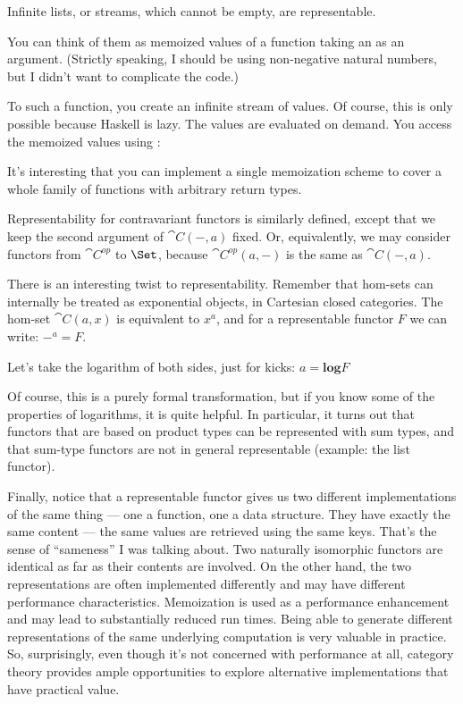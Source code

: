 Infinite lists, or streams, which cannot be empty, are representable.

You can think of them as memoized values of a function taking an
 as an argument. (Strictly speaking, I should be using
non-negative natural numbers, but I didn't want to complicate the code.)

To  such a function, you create an infinite stream of
values. Of course, this is only possible because Haskell is lazy. The
values are evaluated on demand. You access the memoized values using
:

It's interesting that you can implement a single memoization scheme to
cover a whole family of functions with arbitrary return types.

Representability for contravariant functors is similarly defined, except
that we keep the second argument of $\cat{C}(-, a)$ fixed. Or,
equivalently, we may consider functors from $\cat{C}^{op}$
to $\Set$, because $\cat{C}^{op}(a, -)$ is the same as
$\cat{C}(-, a)$.

There is an interesting twist to representability. Remember that
hom-sets can internally be treated as exponential objects, in Cartesian
closed categories. The hom-set $\cat{C}(a, x)$ is equivalent to
$x^a$, and for a representable functor $F$ we can write: $-^a = F$.

Let's take the logarithm of both sides, just for kicks: $a = \mathbf{log}F$

Of course, this is a purely formal transformation, but if you know some
of the properties of logarithms, it is quite helpful. In particular, it
turns out that functors that are based on product types can be
represented with sum types, and that sum-type functors are not in
general representable (example: the list functor).

Finally, notice that a representable functor gives us two different
implementations of the same thing --- one a function, one a data
structure. They have exactly the same content --- the same values are
retrieved using the same keys. That's the sense of ``sameness'' I was
talking about. Two naturally isomorphic functors are identical as far as
their contents are involved. On the other hand, the two representations
are often implemented differently and may have different performance
characteristics. Memoization is used as a performance enhancement and
may lead to substantially reduced run times. Being able to generate
different representations of the same underlying computation is very
valuable in practice. So, surprisingly, even though it's not concerned
with performance at all, category theory provides ample opportunities to
explore alternative implementations that have practical value.

